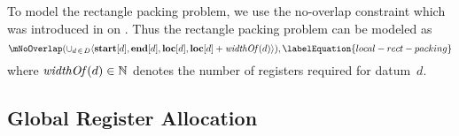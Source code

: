 To model the rectangle packing problem, we use the \gls{no-overlap constraint}
which was introduced in  on
.
%
Thus the rectangle packing problem can be modeled as
%
\begin{equation}
  \mNoOverlap\!
  \left(
    \cup_{d \,\in\, \mDataSet}
      \mTuple{
         \mVar{start}[d],
         \mVar{end}[d],
         \mVar{loc}[d],
         \mVar{loc}[d] + \mWidthOf(d)
      }
  \right)\!,
  \labelEquation{local-rect-packing}
\end{equation}
%
where \mbox{$\operatorname{\textrm{\textit{widthOf}}}(d) \in \mathbb{N}$} denotes the number of
\glspl{register} required for \gls{datum}~$d$\hspace{-1pt}.


\subsection{Global Register Allocation}

